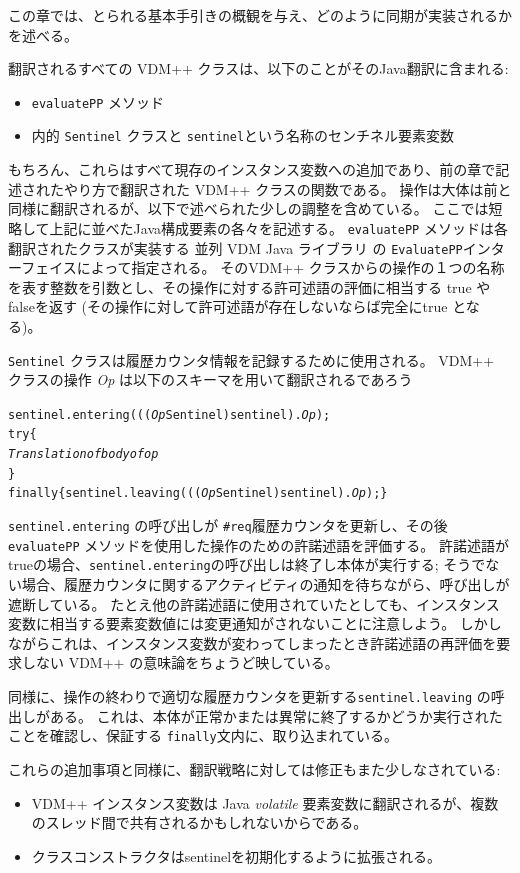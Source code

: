\documentclass[\pformat,11pt]{jarticle}
\newcommand{\VDM}{VDM++}
\newcommand{\CJL}{並列 VDM Java ライブラリ}
\begin{document}
この章では、とられる基本手引きの概観を与え、どのように同期が実装されるかを述べる。

翻訳されるすべての VDM++ クラスは、以下のことがそのJava翻訳に含まれる:
\begin{itemize}
\item  \texttt{evaluatePP} メソッド
\item 内的 \texttt{Sentinel} クラスと \texttt{sentinel}という名称のセンチネル要素変数
\end{itemize}
もちろん、これらはすべて現存のインスタンス変数への追加であり、前の章で記述されたやり方で翻訳された VDM++ クラスの関数である。
操作は大体は前と同様に翻訳されるが、以下で述べられた少しの調整を含めている。
ここでは短略して上記に並べたJava構成要素の各々を記述する。
 \texttt{evaluatePP} メソッドは各翻訳されたクラスが実装する \CJL{} の \texttt{EvaluatePP}インターフェイスによって指定される。
そのVDM++ クラスからの操作の１つの名称を表す整数を引数とし、その操作に対する許可述語の評価に相当する true や falseを返す (その操作に対して許可述語が存在しないならば完全にtrue となる)。

 \texttt{Sentinel} クラスは履歴カウンタ情報を記録するために使用される。
 \VDM{} クラスの操作 \textit{Op} は以下のスキーマを用いて翻訳されるであろう
\begin{alltt}
    sentinel.entering(((\textit{Op}Sentinel) sentinel).\textit{Op});
    try \{
      \textit{Translation of body of op}
    \}
    finally \{ sentinel.leaving(((\textit{Op}Sentinel) sentinel).\textit{Op});\}
\end{alltt}
 \texttt{sentinel.entering} の呼び出しが \texttt{\#req}履歴カウンタを更新し、その後 \texttt{evaluatePP} メソッドを使用した操作のための許諾述語を評価する。
許諾述語が trueの場合、\texttt{sentinel.entering}の呼び出しは終了し本体が実行する; そうでない場合、履歴カウンタに関するアクティビティの通知を待ちながら、呼び出しが遮断している。
たとえ他の許諾述語に使用されていたとしても、インスタンス変数に相当する要素変数値には変更通知がされないことに注意しよう。
しかしながらこれは、インスタンス変数が変わってしまったとき許諾述語の再評価を要求しない \VDM{} の意味論をちょうど映している。

同様に、操作の終わりで適切な履歴カウンタを更新する\texttt{sentinel.leaving} の呼出しがある。
これは、本体が正常かまたは異常に終了するかどうか実行されたことを確認し、保証する \texttt{finally}文内に、取り込まれている。

これらの追加事項と同様に、翻訳戦略に対しては修正もまた少しなされている:
\begin{itemize}
\item \VDM{} インスタンス変数は Java \textit{volatile} 要素変数に翻訳されるが、複数のスレッド間で共有されるかもしれないからである。
\item クラスコンストラクタはsentinelを初期化するように拡張される。
\end{itemize}
\end{document}
